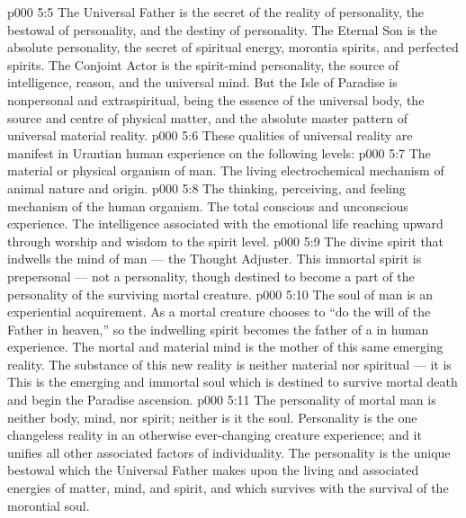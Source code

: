 \vs p000 5:5 \pc The Universal Father is the secret of the reality of personality, the bestowal of personality, and the destiny of personality. The Eternal Son is the absolute personality, the secret of spiritual energy, morontia spirits, and perfected spirits. The Conjoint Actor is the spirit\hyp{}mind personality, the source of intelligence, reason, and the universal mind. But the Isle of Paradise is nonpersonal and extraspiritual, being the essence of the universal body, the source and centre of physical matter, and the absolute master pattern of universal material reality.
\vs p000 5:6 \pc These qualities of universal reality are manifest in Urantian human experience on the following levels:
\vs p000 5:7 \bibnobreakspace {} The material or physical organism of man. The living electrochemical mechanism of animal nature and origin.
\vs p000 5:8 \bibnobreakspace {} The thinking, perceiving, and feeling mechanism of the human organism. The total conscious and unconscious experience. The intelligence associated with the emotional life reaching upward through worship and wisdom to the spirit level.
\vs p000 5:9 \bibnobreakspace {} The divine spirit that indwells the mind of man --- the Thought Adjuster. This immortal spirit is prepersonal --- not a personality, though destined to become a part of the personality of the surviving mortal creature.
\vs p000 5:10 \bibnobreakspace {} The soul of man is an experiential acquirement. As a mortal creature chooses to “do the will of the Father in heaven,” so the indwelling spirit becomes the father of a  in human experience. The mortal and material mind is the mother of this same emerging reality. The substance of this new reality is neither material nor spiritual --- it is  This is the emerging and immortal soul which is destined to survive mortal death and begin the Paradise ascension.
\vs p000 5:11 \pc {} The personality of mortal man is neither body, mind, nor spirit; neither is it the soul. Personality is the one changeless reality in an otherwise ever\hyp{}changing creature experience; and it unifies all other associated factors of individuality. The personality is the unique bestowal which the Universal Father makes upon the living and associated energies of matter, mind, and spirit, and which survives with the survival of the morontial soul.
